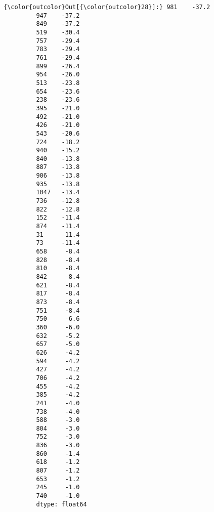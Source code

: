 \documentclass[11pt]{article}
\begin{document}
\begin{Verbatim}[commandchars=\\\{\}]
{\color{outcolor}Out[{\color{outcolor}28}]:} 981    -37.2
         947    -37.2
         849    -37.2
         519    -30.4
         757    -29.4
         783    -29.4
         761    -29.4
         899    -26.4
         954    -26.0
         513    -23.8
         654    -23.6
         238    -23.6
         395    -21.0
         492    -21.0
         426    -21.0
         543    -20.6
         724    -18.2
         940    -15.2
         840    -13.8
         887    -13.8
         906    -13.8
         935    -13.8
         1047   -13.4
         736    -12.8
         822    -12.8
         152    -11.4
         874    -11.4
         31     -11.4
         73     -11.4
         658     -8.4
         828     -8.4
         810     -8.4
         842     -8.4
         621     -8.4
         817     -8.4
         873     -8.4
         751     -8.4
         750     -6.6
         360     -6.0
         632     -5.2
         657     -5.0
         626     -4.2
         594     -4.2
         427     -4.2
         706     -4.2
         455     -4.2
         385     -4.2
         241     -4.0
         738     -4.0
         588     -3.0
         804     -3.0
         752     -3.0
         836     -3.0
         860     -1.4
         618     -1.2
         807     -1.2
         653     -1.2
         245     -1.0
         740     -1.0
         dtype: float64
\end{Verbatim}
            
\end{document}
